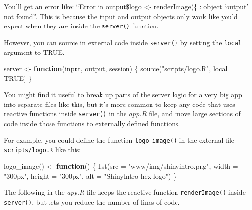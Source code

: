 \documentclass[
]{book}
\newenvironment{Shaded}{\begin{snugshade}}{\end{snugshade}}
\newcommand{\AttributeTok}[1]{\textcolor[rgb]{0.77,0.63,0.00}{#1}}
\newcommand{\ConstantTok}[1]{\textcolor[rgb]{0.00,0.00,0.00}{#1}}
\newcommand{\ControlFlowTok}[1]{\textcolor[rgb]{0.13,0.29,0.53}{\textbf{#1}}}
\newcommand{\FunctionTok}[1]{\textcolor[rgb]{0.00,0.00,0.00}{#1}}
\newcommand{\NormalTok}[1]{#1}
\newcommand{\OtherTok}[1]{\textcolor[rgb]{0.56,0.35,0.01}{#1}}
\newcommand{\SpecialCharTok}[1]{\textcolor[rgb]{0.00,0.00,0.00}{#1}}
\newcommand{\StringTok}[1]{\textcolor[rgb]{0.31,0.60,0.02}{#1}}
\begin{document}
You'll get an error like: ``Error in output\$logo \textless- renderImage(\{ : object `output' not found''. This is because the input and output objects only work like you'd expect when they are inside the \texttt{server()} function.

However, you can source in external code inside \texttt{server()} by setting the \texttt{local} argument to TRUE.

\begin{Shaded}
\begin{Highlighting}[]
\NormalTok{server }\OtherTok{\textless{}{-}} \ControlFlowTok{function}\NormalTok{(input, output, session) \{}
    \FunctionTok{source}\NormalTok{(}\StringTok{"scripts/logo.R"}\NormalTok{, }\AttributeTok{local =} \ConstantTok{TRUE}\NormalTok{)}
\NormalTok{\} }
\end{Highlighting}
\end{Shaded}

You might find it useful to break up parts of the server logic for a very big app into separate files like this, but it's more common to keep any code that uses reactive functions inside \texttt{server()} in the \emph{app.R} file, and move large sections of code inside those functions to externally defined functions.

For example, you could define the function \texttt{logo\_image()} in the external file \texttt{scripts/logo.R} like this:

\begin{Shaded}
\begin{Highlighting}[]
\FunctionTok{logo\_image}\NormalTok{() }\OtherTok{\textless{}{-}} \ControlFlowTok{function}\NormalTok{() \{}
  \FunctionTok{list}\NormalTok{(}\AttributeTok{src =} \StringTok{"www/img/shinyintro.png"}\NormalTok{,}
       \AttributeTok{width =} \StringTok{"300px"}\NormalTok{,}
       \AttributeTok{height =} \StringTok{"300px"}\NormalTok{,}
       \AttributeTok{alt =} \StringTok{"ShinyIntro hex logo"}\NormalTok{)}
\NormalTok{\}}
\end{Highlighting}
\end{Shaded}

The following in the \emph{app.R} file keeps the reactive function \texttt{renderImage()} inside \texttt{server()}, but lets you reduce the number of lines of code.

\begin{Shaded}
\end{Shaded}
\end{document}
